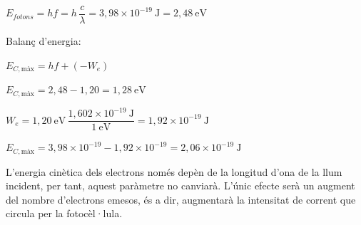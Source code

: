 \begin{solapartat}
 $E_\mathit{fotons} = hf = h\,\dfrac{c}{\lambda} = 3,98\times 10^{-19}\ \mathrm{J} = 2,48\ \mathrm{eV}$

Balanç d'energia:

 $E_{C,\text{màx}} = hf + (-W_e)$

 $E_{C,\text{màx}} = 2,48 - 1,20 = 1,28\ \mathrm{eV}$ \qquad {}


 $W_e = 1,20\ \mathrm{eV}\,\dfrac{1,602\times 10^{-19}\ \mathrm{J}}{1\ \mathrm{eV}} = 1,92\times 10^{-19}\ \mathrm{J}$

 $E_{C,\text{màx}} = 3,98\times 10^{-19} - 1,92\times 10^{-19} = 2,06\times 10^{-19}\ \mathrm{J}$ \qquad {}
\end{solapartat}

\begin{solapartat}
 L'energia cinètica dels electrons només depèn de la longitud d'ona de la llum incident, per tant, aquest paràmetre no canviarà.
L'únic efecte serà un augment del nombre d'electrons emesos, és a dir, augmentarà la intensitat de corrent que circula per la fotocèl·lula.
\end{solapartat}
